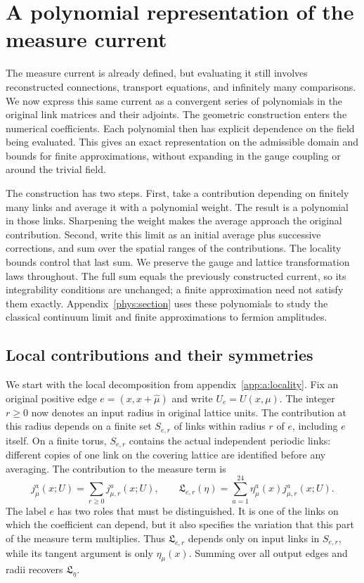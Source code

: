 \documentclass[11pt,a4paper]{article}
\theoremstyle{remark}
\begin{document}
\section{A polynomial representation of the measure current}
\label{poly:section}

The measure current is already defined, but evaluating it still involves
reconstructed connections, transport equations, and infinitely many
comparisons. We now express this same current as a convergent series of
polynomials in the original link matrices and their adjoints. The
geometric construction enters the numerical coefficients. Each polynomial
then has explicit dependence on the field being evaluated.
This gives an exact representation on the admissible domain and bounds
for finite approximations, without expanding in the gauge coupling or
around the trivial field.

The construction has two steps. First, take a contribution depending on
finitely many links and average it with a polynomial weight. The result
is a polynomial in those links. Sharpening the weight makes the average
approach the original contribution. Second, write this limit as an
initial average plus successive corrections, and sum over the spatial
ranges of the contributions. The locality bounds control that last sum.
We preserve the gauge and lattice transformation laws throughout. The
full sum equals the previously constructed current, so its integrability
conditions are unchanged; a finite approximation need not satisfy them
exactly. Appendix~\ref{phys:section} uses these polynomials to study
the classical continuum limit and finite approximations to fermion
amplitudes.

\subsection{Local contributions and their symmetries}

We start with the local decomposition from
appendix~\ref{app:a:locality}. Fix an original positive edge
$e=(x,x+\hat\mu)$ and write $U_e=U(x,\mu)$. The integer $r\ge0$
now denotes an input radius in original lattice units. The contribution
at this radius depends on a finite set $S_{e,r}$ of links within radius
$r$ of $e$, including $e$ itself. On a finite torus, $S_{e,r}$
contains the actual independent periodic links: different copies of one
link on the covering lattice are identified before any averaging.
The contribution to the measure term is
\begin{equation}
 j_\mu^a(x;U)=\sum_{r\geq0}j_{\mu,r}^a(x;U),\qquad
 \mathfrak L_{e,r}(\eta)
   =\sum_{a=1}^{24}\eta_\mu^a(x)j_{\mu,r}^a(x;U).
\end{equation}
The label $e$ has two roles that must be distinguished. It is one of the
links on which the coefficient can depend, but it also specifies the
variation that this part of the measure term multiplies. Thus
$\mathfrak L_{e,r}$ depends only on input links in $S_{e,r}$, while
its tangent argument is only $\eta_\mu(x)$. Summing over all output
edges and radii recovers $\mathfrak L_\eta$.
\end{document}
